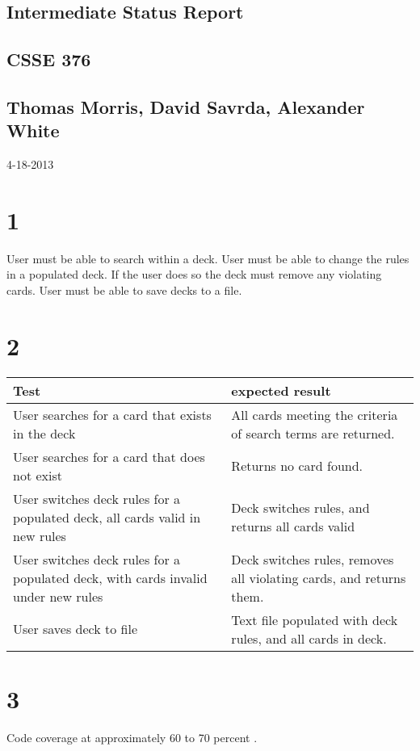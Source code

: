 \documentclass{article}
\begin{document}
	\begin{titlepage}
		\vspace*{\fill}
		\hrulefill
		\begin{center}
			\section*{Intermediate Status Report}
			\subsection*{CSSE 376}
			\subsection*{Thomas Morris, David Savrda, Alexander White}
			4-18-2013
		\end{center}
		\hrulefill
		\vspace*{\fill}
	\end{titlepage}
	\newpage
	\section*{1}
		User must be able to search within a deck. User must be able to change the rules in a populated deck. If the user does so the deck must remove any violating cards. User must be able to save decks to a file.
	\section*{2}
		\begin{tabular}{| l | l |} \hline
			Test & expected result \\ \hline
			User searches for a card that exists in the deck & All cards meeting the criteria of search terms are returned. \\ \hline
			User searches for a card that does not exist & Returns no card found. \\ \hline
			User switches deck rules for a populated deck, all cards valid in new rules & Deck switches rules, and returns all cards valid \\ \hline
			User switches deck rules for  a populated deck, with cards invalid under new rules & Deck switches rules, removes all violating cards, and returns them. \\ \hline
			User saves deck to file & Text file populated with deck rules, and all cards in deck. \\ \hline
		\end{tabular}
	\section*{3}
		Code coverage at approximately 60 to 70 percent .
	
	
\end{document}
